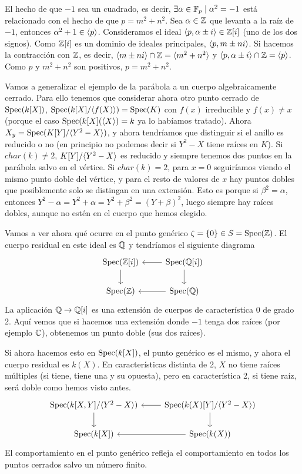 \documentclass[GA.tex]{subfiles}
\begin{document}
\begin{nota}
El hecho de que $-1$ sea un cuadrado, es decir, $\exists\alpha\in\mathbb{F}_p\mid \alpha^2=-1$ está relacionado con el hecho de que $p=m^2+n^2$. Sea $\alpha\in\mathbb{Z}$ que levanta a la raíz de $-1$, entonces $\alpha^2+1\in\langle{p}\rangle$. Consideramos el ideal $\langle{p,\alpha\pm i}\rangle\in\mathbb{Z}[i]$ (uno de los dos signos). Como $\mathbb{Z}[i]$ es un dominio de ideales principales, $\langle{p,m\pm ni}\rangle$. Si hacemos la contracción con $\mathbb{Z}$, es decir, $\langle{m\pm ni}\rangle\cap\mathbb{Z}=\langle{m^2+n^2}\rangle$ y $\langle{p,\alpha\pm i}\rangle\cap\mathbb{Z}=\langle{p}\rangle$. Como $p$ y $m^2+n^2$ son positivos, $p=m^2+n^2$. 
\end{nota}

\begin{ej}
Vamos a generalizar el ejemplo de la parábola a un cuerpo algebraicamente cerrado. Para ello tenemos que considerar ahora otro punto cerrado de $\operatorname{Spec}(k[X])$, $\operatorname{Spec}(k[X]/\langle{f(X)}\rangle)=\operatorname{Spec}(K)$ con $f(x)$ irreducible y $f(x)\neq x$ (porque el caso $\operatorname{Spec}(k[X](\langle{X}\rangle)=k$ ya lo habíamos tratado). Ahora $X_y=\operatorname{Spec}(K[Y]/\langle{Y^2-X}\rangle)$, y ahora tendríamos que distinguir si el anillo es reducido o no (en principio no podemos decir si $Y^2-X$ tiene raíces en $K$). Si $char(k)\neq 2$, $K[Y]/\langle{Y^2-X}\rangle$ es reducido y siempre tenemos dos puntos en la parábola salvo en el vértice. Si $char(k)=2$, para $x=0$ seguiríamos viendo el mismo punto doble del vértice, y para el resto de valores de $x$ hay puntos dobles que posiblemente solo se distingan en una extensión. Esto es porque si $\beta^2=\alpha$, entonces $Y^2-\alpha=Y^2+\alpha=Y^2+\beta^2=(Y+\beta)^2$, luego siempre hay raíces dobles, aunque no estén en el cuerpo que hemos elegido. 

Vamos a ver ahora qué ocurre en el punto genérico $\zeta=\{0\}\in S=\operatorname{Spec}(\mathbb{Z})$. El cuerpo residual en este ideal es $\mathbb{Q}$ y tendríamos el siguiente diagrama
\[
\begin{tikzcd}
\spec(\Z[i])\arrow[d] & \spec(\Q[i])\arrow[l]\arrow[d]\\
\spec(\Z) & \spec(\Q)\arrow[l]
\end{tikzcd}
\]
La aplicación $\mathbb{Q}\to\mathbb{Q}[i]$ es una extensión de cuerpos de característica 0 de grado 2. Aquí vemos que si hacemos una extensión donde $-1$ tenga dos raíces (por ejemplo $\mathbb{C}$), obtenemos un punto doble (sus dos raíces).

Si ahora hacemos esto en $\operatorname{Spec}(k[X])$, el punto genérico es el mismo, y ahora el cuerpo residual es $k(X)$. En características distinta de 2, $X$ no tiene raíces múltiples (si tiene, tiene una y su opuesta), pero en característica 2, si tiene raíz, será doble como hemos visto antes.
\[
\begin{tikzcd}
\spec(k[X,Y]/\gene{Y^2-X})\arrow[d] & \spec(k(X)[Y]/\gene{Y^2-X})\arrow[d]\arrow[l]\\
\spec(k[X])& \arrow[l]\spec(k(X))
\end{tikzcd}
\]
El comportamiento en el punto genérico refleja el comportamiento en todos los puntos cerrados salvo un número finito. 
\end{ej}
\end{document}
